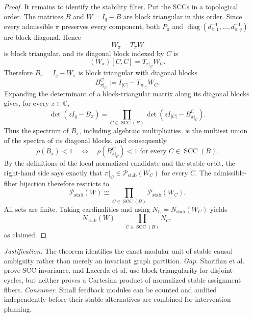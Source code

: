 \documentclass{article}
\begin{document}
\begin{proof}
It remains to identify the stability filter. Put the SCCs in a topological order. The matrices \(B\) and \(W=I_q-B\) are block triangular in this order. Since every admissible \(\pi\) preserves every component, both \(P_\pi\) and \(\operatorname{diag}(d_{\pi,1}^{-1},\ldots,d_{\pi,q}^{-1})\) are block diagonal. Hence
\[
 W_\pi=T_\pi W
\]
is block triangular, and its diagonal block indexed by \(C\) is
\[
 (W_\pi)[C,C]
 =T_{\pi|_C}W_C.
\]
Therefore \(B_\pi=I_q-W_\pi\) is block triangular with diagonal blocks
\[
 B^C_{\pi|_C}:=I_{|C|}-T_{\pi|_C}W_C.
\]
Expanding the determinant of a block-triangular matrix along its diagonal blocks gives, for every \(z\in\mathbb C\),
\[
 \det(zI_q-B_\pi)
 =\prod_{C\in\operatorname{SCC}(B)}
   \det\!\left(zI_{|C|}-B^C_{\pi|_C}\right).
\]
Thus the spectrum of \(B_\pi\), including algebraic multiplicities, is the multiset union of the spectra of its diagonal blocks, and consequently
\[
 \rho(B_\pi)<1
 \quad\Longleftrightarrow\quad
 \rho\!\left(B^C_{\pi|_C}\right)<1
 \text{ for every }C\in\operatorname{SCC}(B).
\]
By the definitions of the local normalized candidate and the stable orbit, the right-hand side says exactly that \(\pi|_C\in\mathcal P_{\mathrm{stab}}(W_C)\) for every \(C\). The admissible-fiber bijection therefore restricts to
\[
 \mathcal P_{\mathrm{stab}}(W)
 \cong
 \prod_{C\in\operatorname{SCC}(B)}
 \mathcal P_{\mathrm{stab}}(W_C).
\]
All sets are finite. Taking cardinalities and using \(N_C=N_{\mathrm{stab}}(W_C)\) yields
\[
 N_{\mathrm{stab}}(W)
 =\prod_{C\in\operatorname{SCC}(B)}N_C,
\]
as claimed.
\end{proof}
\par\smallskip\noindent \textit{Justification.} The theorem identifies the exact modular unit of stable causal ambiguity rather than merely an invariant graph partition. \textit{Gap.} Sharifian et al. prove SCC invariance, and Lacerda et al. use block triangularity for disjoint cycles, but neither proves a Cartesian product of normalized stable assignment fibers. \textit{Consumer.} Small feedback modules can be counted and audited independently before their stable alternatives are combined for intervention planning.
\end{document}
